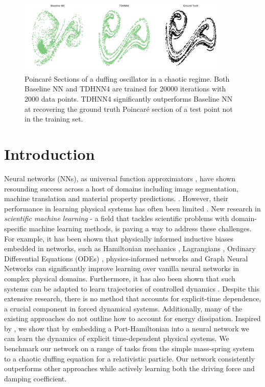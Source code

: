 \documentclass[twoside]{article}
\begin{document}
\begin{figure}[ht!]
\centering
\includegraphics[width=0.9\textwidth]{figures/main_fig.pdf}
\caption{Poincar\'e Sections of a duffing oscillator in a chaotic regime. Both Baseline NN and TDHNN4 are trained for 20000 iterations with 2000 data points. TDHNN4 significantly outperforms Baseline NN at recovering the ground truth Poincar\'e section of a test point not in the training set.}
\label{fig.chaos1}
\end{figure}

\section{Introduction}

Neural networks (NNs), as universal function approximators \cite{hornik_multilayer_1989}, have shown resounding success across a host of domains including image segmentation, machine translation and material property predictions. \cite{he_mask_2018,devlin_bert_2019,toussaint_differentiable_2018,yao_tensormol-01_2018}. However, their performance in learning physical systems has often been limited \cite{greydanus_hamiltonian_2019,pukrittayakamee_simultaneous_2009}. New research in \textit{scientific machine learning} - a field that tackles scientific problems with domain-specific machine learning methods, is paving a way to address these challenges. For example, it has been shown that physically informed inductive biases embedded in networks, such as Hamiltonian mechanics \cite{mattheakis_hamiltonian_2020, greydanus_hamiltonian_2019}, Lagrangians \cite{cranmer_lagrangian_2020, lutter_deep_2019}, Ordinary Differential Equations (ODEs) \cite{chen_neural_2018}, physics-informed networks \cite{raissi_physics_2017} and Graph Neural Networks \cite{battaglia_interaction_2016,sanchez-gonzalez_hamiltonian_2019} can significantly improve learning over vanilla neural networks in complex physical domains. Furthermore, it has also been shown that such systems can be adapted to learn trajectories of controlled dynamics \cite{lutter_deep_2019,zhong_dissipative_2020}. Despite this extensive research, there is no method that accounts for explicit-time dependence, a crucial component in forced dynamical systems. Additionally, many of the existing approaches do not outline how to account for energy dissipation. Inspired by \cite{zhong_dissipative_2020}, we show that by embedding a Port-Hamiltonian into a neural network we can learn the dynamics of explicit time-dependent physical systems. We benchmark our network on a range of tasks from the simple mass-spring system to a chaotic duffing equation for a relativistic particle. Our network consistently outperforms other approaches while actively learning both the driving force and damping coefficient. 
\end{document}
